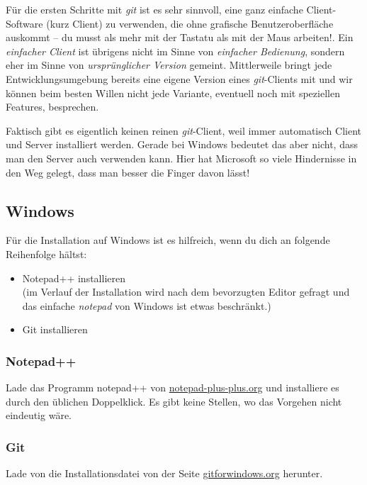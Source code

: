 \documentclass[
  ngerman,
  letterpaper,
  DIV=11]{scrreprt}
\providecommand{\tightlist}{%
  \setlength{\itemsep}{0pt}\setlength{\parskip}{0pt}}
\newcommand{\git}{\textit{git}\xspace}
\begin{document}
Für die ersten Schritte mit \git ist es sehr sinnvoll, eine ganz
einfache Client-Software (kurz Client) zu verwenden, die ohne grafische
Benutzeroberfläche auskommt -- du musst als mehr mit der Tastatu als mit
der Maus arbeiten!. Ein \emph{einfacher Client} ist übrigens nicht im
Sinne von \emph{einfacher Bedienung}, sondern eher im Sinne von
\emph{ursprünglicher Version} gemeint. Mittlerweile bringt jede
Entwicklungsumgebung bereits eine eigene Version eines \git-Clients mit
und wir können beim besten Willen nicht jede Variante, eventuell noch
mit speziellen Features, besprechen.

Faktisch gibt es eigentlich keinen reinen \git-Client, weil immer
automatisch Client und Server installiert werden. Gerade bei Windows
bedeutet das aber nicht, dass man den Server auch verwenden kann. Hier
hat Microsoft so viele Hindernisse in den Weg gelegt, dass man besser
die Finger davon lässt!

\subsection{Windows}\label{windows}

Für die Installation auf Windows ist es hilfreich, wenn du dich an
folgende Reihenfolge hältst:

\begin{itemize}
\tightlist
\item
  Notepad++ installieren\\
  (im Verlauf der Installation wird nach dem bevorzugten Editor gefragt
  und das einfache \emph{notepad} von Windows ist etwas beschränkt.)
\item
  Git installieren
\end{itemize}

\subsubsection{Notepad++}\label{notepad}

Lade das Programm notepad++ von
\href{https://notepad-plus-plus.org/downloads/}{notepad-plus-plus.org}
und installiere es durch den üblichen Doppelklick. Es gibt keine
Stellen, wo das Vorgehen nicht eindeutig wäre.

\subsubsection{Git}\label{git}

Lade von die Installationsdatei von der Seite
\href{https://gitforwindows.org}{gitforwindows.org} herunter.
\end{document}
